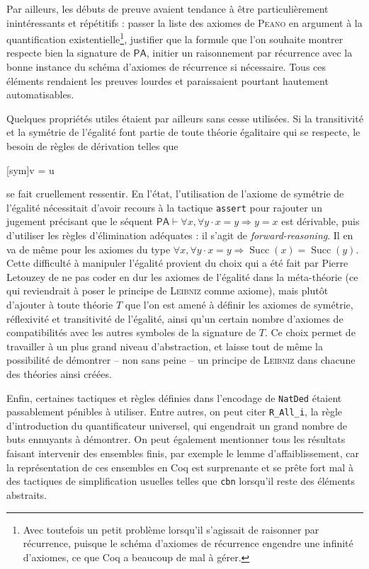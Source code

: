 \documentclass[a4paper]{article}
\DeclareMathOperator{\Succ}{\mathrm{Succ}}
\newcommand{\PA}{\mathsf{PA}}
\begin{document}
Par ailleurs, les débuts de preuve avaient tendance à être particulièrement inintéressants et répétitifs : passer la liste des axiomes de \textsc{Peano} en argument à la quantification existentielle\footnote{Avec toutefois un petit problème lorsqu'il s'agissait de raisonner par récurrence, puisque le schéma d'axiomes de récurrence engendre une infinité d'axiomes, ce que Coq a beaucoup de mal à gérer.}, justifier que la formule que l'on souhaite montrer respecte bien la signature de $\PA$, initier un raisonnement par récurrence avec la bonne instance du schéma d'axiomes de récurrence si nécessaire. Tous ces éléments rendaient les preuves lourdes et paraissaient pourtant hautement automatisables.

Quelques propriétés utiles étaient par ailleurs sans cesse utilisées. Si la transitivité et la symétrie de l'égalité font partie de toute théorie égalitaire qui se respecte, le besoin de règles de dérivation telles que \begin{prooftree*}
[sym]{\Gamma \vdash v = u}
\end{prooftree*} se fait cruellement ressentir. En l'état, l'utilisation de l'axiome de symétrie de l'égalité nécessitait d'avoir recours à la tactique \verb+assert+ pour rajouter un jugement précisant que le séquent $\PA \vdash \forall x, \forall y \cdot x = y \Rightarrow y = x$ est dérivable, puis d'utiliser les règles d'élimination adéquates : il s'agit de \emph{forward-reasoning}. Il en va de même pour les axiomes du type $\forall x, \forall y \cdot x = y \Rightarrow \Succ (x) = \Succ (y)$. Cette difficulté à manipuler l'égalité provient du choix qui a été fait par Pierre Letouzey de ne pas coder en dur les axiomes de l'égalité dans la méta-théorie (ce qui reviendrait à poser le principe de \textsc{Leibniz} comme axiome), mais plutôt d'ajouter à toute théorie $T$ que l'on est amené à définir les axiomes de symétrie, réflexivité et transitivité de l'égalité, ainsi qu'un certain nombre d'axiomes de compatibilités avec les autres symboles de la signature de $T$. Ce choix permet de travailler à un plus grand niveau d'abstraction, et laisse tout de même la possibilité de démontrer -- non sans peine -- un principe de \textsc{Leibniz} dans chacune des théories ainsi créées.

Enfin, certaines tactiques et règles définies dans l'encodage de \verb+NatDed+ étaient passablement pénibles à utiliser. Entre autres, on peut citer \verb+R_All_i+, la règle d'introduction du quantificateur universel, qui engendrait un grand nombre de buts ennuyants à démontrer. On peut également mentionner tous les résultats faisant intervenir des ensembles finis, par exemple le lemme d'affaiblissement, car la représentation de ces ensembles en Coq est surprenante et se prête fort mal à des tactiques de simplification usuelles telles que \verb+cbn+ lorsqu'il reste des éléments abstraits.
\end{document}
